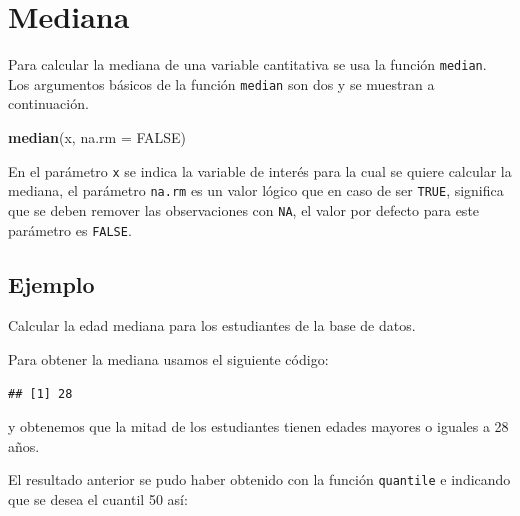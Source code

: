 \documentclass[10pt,]{krantz}
\makeatletter
\newenvironment{Shaded}{\begin{snugshade}}{\end{snugshade}}
\newcommand{\KeywordTok}[1]{\textcolor[rgb]{0.13,0.29,0.53}{\textbf{{#1}}}}
\newcommand{\DataTypeTok}[1]{\textcolor[rgb]{0.13,0.29,0.53}{{#1}}}
\newcommand{\FloatTok}[1]{\textcolor[rgb]{0.00,0.00,0.81}{{#1}}}
\newcommand{\OtherTok}[1]{\textcolor[rgb]{0.56,0.35,0.01}{{#1}}}
\newcommand{\NormalTok}[1]{{#1}}
\newenvironment{kframe}{%
\medskip{}
\setlength{\fboxsep}{.8em}
 \def\at@end@of@kframe{}%
 \ifinner\ifhmode%
  \def\at@end@of@kframe{\end{minipage}}%
  \begin{minipage}{\columnwidth}%
 \fi\fi%
 \def\FrameCommand##1{\hskip\@totalleftmargin \hskip-\fboxsep
 \colorbox{shadecolor}{##1}\hskip-\fboxsep
     \hskip-\linewidth \hskip-\@totalleftmargin \hskip\columnwidth}%
 \MakeFramed {\advance\hsize-\width
   \@totalleftmargin\z@ \linewidth\hsize
   \@setminipage}}%
 {\par\unskip\endMakeFramed%
 \at@end@of@kframe}
\renewenvironment{Shaded}{\begin{kframe}}{\end{kframe}}
\makeatother
\begin{document}
\section{\texorpdfstring{Mediana 
}{Mediana  }}\label{mediana}

Para calcular la mediana de una variable cantitativa se usa la función
\texttt{median}. Los argumentos básicos de la función \texttt{median}
son dos y se muestran a continuación.

\begin{Shaded}
\begin{Highlighting}[]
\KeywordTok{median}\NormalTok{(x, }\DataTypeTok{na.rm =} \OtherTok{FALSE}\NormalTok{)}
\end{Highlighting}
\end{Shaded}

En el parámetro \texttt{x} se indica la variable de interés para la cual
se quiere calcular la mediana, el parámetro \texttt{na.rm} es un valor
lógico que en caso de ser \texttt{TRUE}, significa que se deben remover
las observaciones con \texttt{NA}, el valor por defecto para este
parámetro es \texttt{FALSE}.

\subsection*{Ejemplo}\label{ejemplo-33}


Calcular la edad mediana para los estudiantes de la base de datos.

Para obtener la mediana usamos el siguiente código:

\begin{Shaded}
\end{Shaded}

\begin{verbatim}
## [1] 28
\end{verbatim}

y obtenemos que la mitad de los estudiantes tienen edades mayores o
iguales a 28 años.

El resultado anterior se pudo haber obtenido con la función
\texttt{quantile} e indicando que se desea el cuantil 50 así:

\begin{Shaded}
\end{Shaded}
\end{document}
